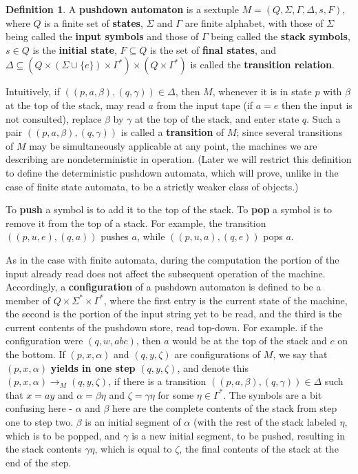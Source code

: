 \documentclass{article}
\theoremstyle{definition}
\newtheorem{definition}{Definition}[section]
\theoremstyle{plain}
\theoremstyle{theorem}
\begin{document}
\begin{definition}
	A \textbf{pushdown automaton} is a sextuple $M = (Q,\Sigma,\Gamma,\Delta,s,F)$, where $Q$ is a finite set of \textbf{states}, $\Sigma$ and $\Gamma$ are finite alphabet, with those of $\Sigma$ being called the \textbf{input symbols} and those of $\Gamma$ being called the \textbf{stack symbols}, $s \in Q$ is the \textbf{initial state}, $F \subseteq Q$ is the set of \textbf{final states}, and $\Delta \subseteq (Q \times (\Sigma \cup \{e\}) \times \Gamma^*) \times (Q \times \Gamma^*)$ is called the \textbf{transition relation}.
\end{definition}
Intuitively, if $((p,a,\beta),(q,\gamma)) \in \Delta$, then $M$, whenever it is in state $p$ with $\beta$ at the top of the stack, may read $a$ from the input tape (if $a = e$ then the input is not consulted), replace $\beta$ by $\gamma$ at the top of the stack, and enter state $q$. Such a pair $((p,a,\beta),(q,\gamma))$ is called a \textbf{transition} of $M$; since several transitions of $M$ may be simultaneously applicable at any point, the machines we are describing are nondeterministic in operation. (Later we will restrict this definition to define the deterministic pushdown automata, which will prove, unlike in the case of finite state automata, to be a strictly weaker class of objects.) \par 
To \textbf{push} a symbol is to add it to the top of the stack. To \textbf{pop} a symbol is to remove it from the top of a stack. For example, the transition $((p,u,e),(q,a))$ pushes $a$, while $((p,u,a),(q,e))$ pops $a$. \par 
As in the case with finite automata, during the computation the portion of the input already read does not affect the subsequent operation of the machine. Accordingly, a \textbf{configuration} of a pushdown automaton is defined to be a member of $Q \times \Sigma^* \times \Gamma^*$, where the first entry is the current state of the machine, the second is the portion of the input string yet to be read, and the third is the current contents of the pushdown store, read top-down. For example. if the configuration were $(q,w,abc)$, then $a$ would be at the top of the stack and $c$ on the bottom. If $(p,x,\alpha)$ and $(q,y,\zeta)$ are configurations of $M$, we say that $(p,x,\alpha)$ \textbf{yields in one step} $(q,y,\zeta)$, and denote this $(p,x,\alpha) \to_M (q,y,\zeta)$, if there is a transition $((p,a,\beta),(q,\gamma)) \in \Delta$ such that $x = ay$ and $\alpha = \beta \eta$ and $\zeta = \gamma \eta$ for some $\eta \in \Gamma^*$. The symbols are a bit confusing here - $\alpha$ and $\beta$ here are the complete contents of the stack from step one to step two. $\beta$ is an initial segment of $\alpha$ (with the rest of the stack labeled $\eta$, which is to be popped, and $\gamma$ is a new initial segment, to be pushed, resulting in the stack contents $\gamma \eta$, which is equal to $\zeta$, the final contents of the stack at the end of the step. \par 
\end{document}
